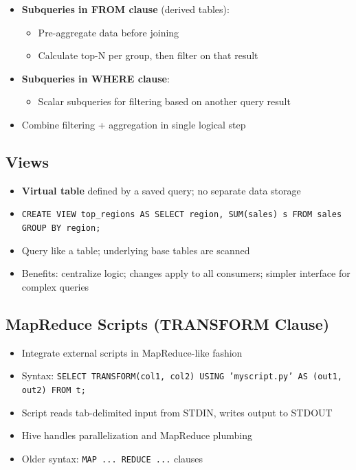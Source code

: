 \documentclass[11pt, onecolumn, a4paper]{article}
\begin{document}
\begin{itemize}
  \item \textbf{Subqueries in FROM clause} (derived tables):
  \begin{itemize}
    \item Pre-aggregate data before joining
    \item Calculate top-N per group, then filter on that result
  \end{itemize}
  \item \textbf{Subqueries in WHERE clause}:
  \begin{itemize}
    \item Scalar subqueries for filtering based on another query result
  \end{itemize}
  \item Combine filtering + aggregation in single logical step
\end{itemize}

\subsection{Views}

\begin{itemize}
  \item \textbf{Virtual table} defined by a saved query; no separate data storage
  \item \texttt{CREATE VIEW top\_regions AS SELECT region, SUM(sales) s FROM sales GROUP BY region;}
  \item Query like a table; underlying base tables are scanned
  \item Benefits: centralize logic; changes apply to all consumers; simpler interface for complex queries
\end{itemize}

\subsection{MapReduce Scripts (TRANSFORM Clause)}

\begin{itemize}
  \item Integrate external scripts in MapReduce-like fashion
  \item Syntax: \texttt{SELECT TRANSFORM(col1, col2) USING 'myscript.py' AS (out1, out2) FROM t;}
  \item Script reads tab-delimited input from STDIN, writes output to STDOUT
  \item Hive handles parallelization and MapReduce plumbing
  \item Older syntax: \texttt{MAP ... REDUCE ...} clauses
\end{itemize}
\end{document}
